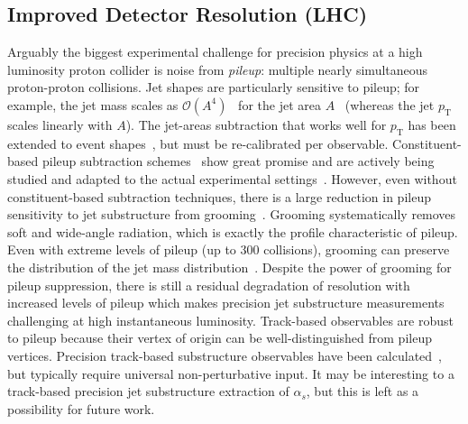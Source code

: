 \subsection{Improved Detector Resolution (LHC)}

Arguably the biggest experimental challenge for precision physics at a high luminosity proton collider is noise from \textit{pileup}: multiple nearly simultaneous proton-proton collisions.  Jet shapes are particularly sensitive to pileup; for example, the jet mass scales as $\mathcal{O}(A^4)$~\cite{Salam:2009jx} for the jet area $A$~\cite{Cacciari:2008gn} (whereas the jet $p_\text{T}$ scales linearly with $A$).  The jet-areas subtraction that works well for $p_\text{T}$ has been extended to event shapes~\cite{Soyez:2012hv}, but must be re-calibrated per observable.  Constituent-based pileup subtraction schemes~\cite{Cacciari:2014gra,Krohn:2013lba,Bertolini:2014bba,Berta:2014eza,Komiske:2017ubm} show great promise and are actively being studied and adapted to the actual experimental settings~\cite{CMS-PAS-JME-14-001,CMS-DP-2015-034,ATLAS-CONF-2017-065,ATL-PHYS-PUB-2017-020,Aad:2015ina}.  However, even without constituent-based subtraction techniques, there is a large reduction in pileup sensitivity to jet substructure from grooming~\cite{CMS-PAS-JME-14-001,Aad:2015rpa,Aad:2015ina}.  Grooming systematically removes soft and wide-angle radiation, which is exactly the profile characteristic of pileup.   Even with extreme levels of pileup (up to 300 collisions), grooming can preserve the distribution of the jet mass distribution~\cite{JetSubstructureECFA2014}.   Despite the power of grooming for pileup suppression, there is still a residual degradation of resolution with increased levels of pileup which makes precision jet substructure measurements challenging at high instantaneous luminosity.  Track-based observables are robust to pileup because their vertex of origin can be well-distinguished from pileup vertices.  Precision track-based substructure observables have been calculated~\cite{Krohn:2012fg,Waalewijn:2012sv,Chang:2013rca,Elder:2017bkd}, but typically require universal non-perturbative input.  It may be interesting to a track-based precision jet substructure extraction of $\alpha_s$, but this is left as a possibility for future work.
